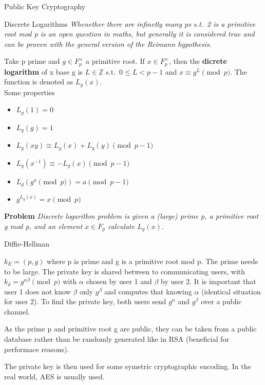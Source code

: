 \documentclass[12pt, letterpaper]{article}
\begin{document}
\begin{section}{Public Key Cryptography}
\begin{subsection}{Discrete Logarithms}
    \textit{Whenether there are infinetly many ps s.t.\ 2 is a primitive root
      mod p is an open question in maths, but generally it is considered true
      and can be proven with the general version of the Reimann hypothesis.}

    Take p prime and \(g \in F_{p}^{\times}\) a primitive root. If
    \(x \in F_{p}^{\times}\), then the \textbf{dicrete logarithm} of x base g
    is \(L \in \mathbb{Z}\) s.t.\ \(0 \leq L < p - 1\) and \(x \equiv g^{L}
    \pmod{p}\). The function is denoted as \(L_{g}(x)\). \\
    Some properties
    \begin{itemize}
      \item \(L_{g}(1) = 0\)
      \item \(L_{g}(g) = 1\)
      \item \(L_{g}(xy) \equiv L_{g}(x) + L_{g}(y) \pmod{p - 1}\)
      \item \(L_{g}(x^{-1}) \equiv -L_{g}(x) \pmod{p - 1}\)
      \item \(L_{g}(g^{a} \pmod{p}) = a \pmod{p - 1}\)
      \item \(g^{L_{g}(x)} = x \pmod{p}\)
    \end{itemize}

    \textbf{Problem}
    \textit{Discrete logarithm problem is given a (large) prime p, a primitive
    root g mod p, and an element \(x \in F_{p}\) calculate \(L_{g}(x)\)}.

  \end{subsection}

  \begin{subsection}{Diffie-Hellman}

    \(k_{E} = (p, g)\) where p is prime and g is a primitive root mod p. The
    prime needs to be large. The private key is shared between to communicating
    users, with \(k_{d} = g^{\alpha\beta} \pmod{p}\) with \(\alpha\) chosen by
    user 1 and \(\beta\) by user 2. It is important that user 1 does not know
    \(\beta\) only \(g^{\beta}\) and computes that knowing \(\alpha\)
    (identical situation for user 2). To find the private key, both users send
    \(g^{\alpha}\) and \(g^{\beta}\) over a public channel.

    As the prime p and primitive root g are public, they can be taken from a
    public database rather than be randomly generated like in RSA (beneficial
    for performace reasons).

    The private key is then used for some symetric cryptographic encoding. In
    the real world, AES is usually used.


\end{subsection}
\end{section}
\end{document}
